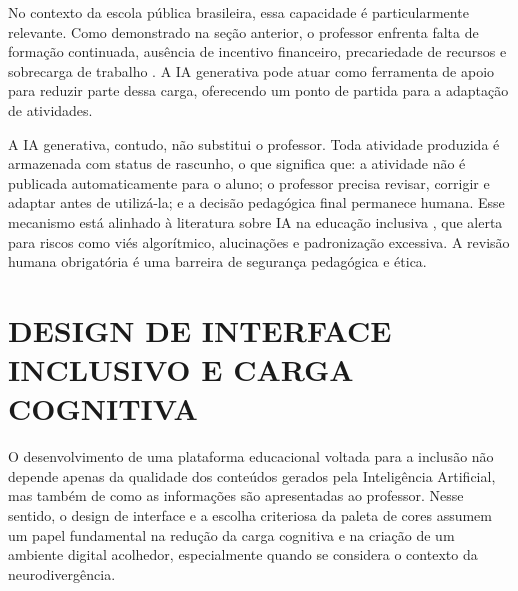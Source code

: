 No contexto da escola pública brasileira, essa capacidade é particularmente relevante. Como demonstrado na seção anterior, o professor enfrenta falta de formação continuada, ausência de incentivo financeiro, precariedade de recursos e sobrecarga de trabalho \cite{irm2026panorama,cunha2025recursos}. A IA generativa pode atuar como ferramenta de apoio para reduzir parte dessa carga, oferecendo um ponto de partida para a adaptação de atividades.

A IA generativa, contudo, não substitui o professor. Toda atividade produzida é armazenada com status de rascunho, o que significa que: a atividade não é publicada automaticamente para o aluno; o professor precisa revisar, corrigir e adaptar antes de utilizá-la; e a decisão pedagógica final permanece humana. Esse mecanismo está alinhado à literatura sobre IA na educação inclusiva \cite{engaja2026}, que alerta para riscos como viés algorítmico, alucinações e padronização excessiva. A revisão humana obrigatória é uma barreira de segurança pedagógica e ética.

\section{DESIGN DE INTERFACE INCLUSIVO E CARGA COGNITIVA}
\label{sec:interface_carga_cognitiva}

O desenvolvimento de uma plataforma educacional voltada para a inclusão não depende apenas da qualidade dos conteúdos gerados pela Inteligência Artificial, mas também de como as informações são apresentadas ao professor. Nesse sentido, o design de interface e a escolha criteriosa da paleta de cores assumem um papel fundamental na redução da carga cognitiva e na criação de um ambiente digital acolhedor, especialmente quando se considera o contexto da neurodivergência.

